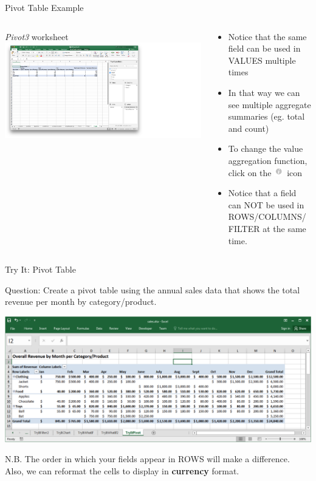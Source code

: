 \documentclass[xcolor=svgnames]{beamer}
\begin{document}
\begin{frame}{Pivot Table Example}
\begin{columns}[T] %
\begin{column}{.48\textwidth}
\textit{Pivot3} worksheet
{\includegraphics[width=1.8\textwidth]{pivotThree}}
\end{column}%
\hfill%
\begin{column}{.48\textwidth}
\vspace{1em}
\begin{itemize}
\item Notice that the same field can be used in VALUES multiple times
\item In that way we can see multiple aggregate summaries (eg. total and count)

\item To change the value aggregation function, click on the  \includegraphics[width=1em]{img/i.png}\ icon
\item Notice that a field can NOT be used in ROWS/COLUMNS/FILTER at the same time.
\end{itemize}
\end{column}%
\end{columns}
\end{frame}



\begin{frame}{Try It: Pivot Table}
\begin{exampleblock}{Question:} Create a pivot table using the annual sales data that shows the total revenue per month by category/product. 
\end{exampleblock}
\begin{center}
\includegraphics[width=.9\textwidth]{TryItPivot.png}
\end{center}
N.B. The order in which your fields appear in ROWS will make a difference.  Also, we can reformat the cells to display in {\bf currency} format.
\end{frame}
\end{document}
